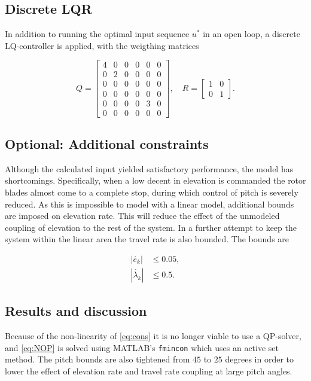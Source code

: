 \subsection{Discrete LQR}
In addition to running the optimal input sequence $u^*$ in an open loop, a discrete LQ-controller is applied, with the weigthing matrices

\begin{equation}
Q = \begin{bmatrix}4&0&0&0&0&0\\0&2&0&0&0&0\\0&0&0&0&0&0\\0&0&0&0&0&0\\0&0&0&0&3&0\\0&0&0&0&0&0\end{bmatrix}, \quad R = \begin{bmatrix}1&0\\0&1\end{bmatrix}.
\end{equation}
\subsection{Optional: Additional constraints}
\label{text:additionalContraints}

Although the calculated input yielded satisfactory performance, the model has shortcomings. Specifically, when a low decent in elevation is commanded the rotor blades almost come to a complete stop, during which control of pitch is severely reduced. As this is impossible to model with a linear model, additional bounds are imposed on elevation rate. This will reduce the effect of the unmodeled coupling of elevation to the rest of the system. In a further attempt to keep the system within the linear area the travel rate is also bounded. The bounds are

\begin{align*}
	|\dot{e_k}| &\le 0.05, \\
	|\dot{\lambda_k}| &\le 0.5.
\end{align*}
\subsection{Results and discussion}
\label{text:problem4_results}
 Because of the non-linearity of \eqref{eq:cons} it is no longer viable to use a QP-solver, and \eqref{eq:NOP} is solved using MATLAB's \texttt{fmincon} which uses an active set method. The pitch bounds are also tightened from $45$ to $25$ degrees in order to lower the effect of elevation rate and travel rate coupling at large pitch angles. 

